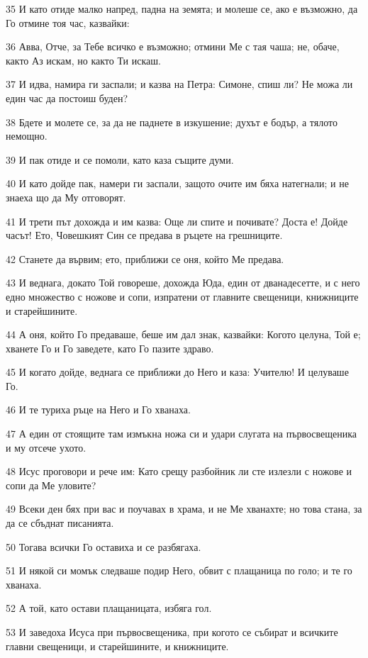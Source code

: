 \par 35 И като отиде малко напред, падна на земята; и молеше се, ако е възможно, да Го отмине тоя час, казвайки:
\par 36 Авва, Отче, за Тебе всичко е възможно; отмини Ме с тая чаша; не, обаче, както Аз искам, но както Ти искаш.
\par 37 И идва, намира ги заспали; и казва на Петра: Симоне, спиш ли? Не можа ли един час да постоиш буден?
\par 38 Бдете и молете се, за да не паднете в изкушение; духът е бодър, а тялото немощно.
\par 39 И пак отиде и се помоли, като каза същите думи.
\par 40 И като дойде пак, намери ги заспали, защото очите им бяха натегнали; и не знаеха що да Му отговорят.
\par 41 И трети път дохожда и им казва: Още ли спите и почивате? Доста е! Дойде часът! Ето, Човешкият Син се предава в ръцете на грешниците.
\par 42 Станете да вървим; ето, приближи се оня, който Ме предава.
\par 43 И веднага, докато Той говореше, дохожда Юда, един от дванадесетте, и с него едно множество с ножове и сопи, изпратени от главните свещеници, книжниците и старейшините.
\par 44 А оня, който Го предаваше, беше им дал знак, казвайки: Когото целуна, Той е; хванете Го и Го заведете, като Го пазите здраво.
\par 45 И когато дойде, веднага се приближи до Него и каза: Учителю! И целуваше Го.
\par 46 И те туриха ръце на Него и Го хванаха.
\par 47 А един от стоящите там измъкна ножа си и удари слугата на първосвещеника и му отсече ухото.
\par 48 Исус проговори и рече им: Като срещу разбойник ли сте излезли с ножове и сопи да Ме уловите?
\par 49 Всеки ден бях при вас и поучавах в храма, и не Ме хванахте; но това стана, за да се сбъднат писанията.
\par 50 Тогава всички Го оставиха и се разбягаха.
\par 51 И някой си момък следваше подир Него, обвит с плащаница по голо; и те го хванаха.
\par 52 А той, като остави плащаницата, избяга гол.
\par 53 И заведоха Исуса при първосвещеника, при когото се събират и всичките главни свещеници, и старейшините, и книжниците.
